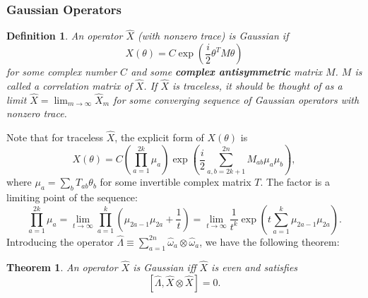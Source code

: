\documentclass[aps,prx,superscriptaddress,nofootinbib]{revtex4}
\newtheorem{theorem}{Theorem}
\newtheorem{definition}{Definition}
\begin{document}
\subsubsection{Gaussian Operators}
\begin{definition}
An operator $\hat X$ (with nonzero trace) is Gaussian if 
$$
X(\theta)=C\exp\left(\frac{i}{2}\theta^TM\theta\right)
$$
for some complex number $C$ and some \textbf{complex antisymmetric} matrix $M$. $M$ is called a correlation matrix of $\hat X$. 
If $\hat X$ is traceless, it should be thought of as a limit $\hat X = \lim_{m\rightarrow\infty} \hat X_m$ for some converging sequence of Gaussian operators with nonzero trace. 
\end{definition}
Note that for traceless $\hat X$, the explicit form of $X(\theta)$ is
\begin{equation}
	X(\theta)=C \left(\prod_{a=1}^{2k}\mu_a\right)\exp\left(\frac{i}{2}\sum_{a,b=2k+1}^{2n} M_{ab}\mu_a \mu_b\right),
\end{equation}
where $\mu_a = \sum_b T_{ab}\theta_b$ for some invertible complex matrix $T$. The factor is a limiting point of the sequence:
$$
\prod_{a=1}^{2k} \mu_a = \lim_{t\rightarrow\infty} \prod_{a=1}^k \left(\mu_{2a-1}\mu_{2a}+\frac{1}{t}\right) = \lim_{t\rightarrow\infty} \frac{1}{t^k} \exp\left(t\sum_{a=1}^k \mu_{2a-1}\mu_{2a}\right).
$$
Introducing the operator $\hat\Lambda \equiv \sum_{a=1}^{2n} \hat \omega_a \otimes \hat \omega_a$, we have the following theorem:
\begin{theorem}
An operator $\hat X$ is Gaussian iff $\hat X$ is even and satisfies $$[\hat\Lambda, \hat X\otimes \hat X]=0.$$
\end{theorem}
\end{document}
